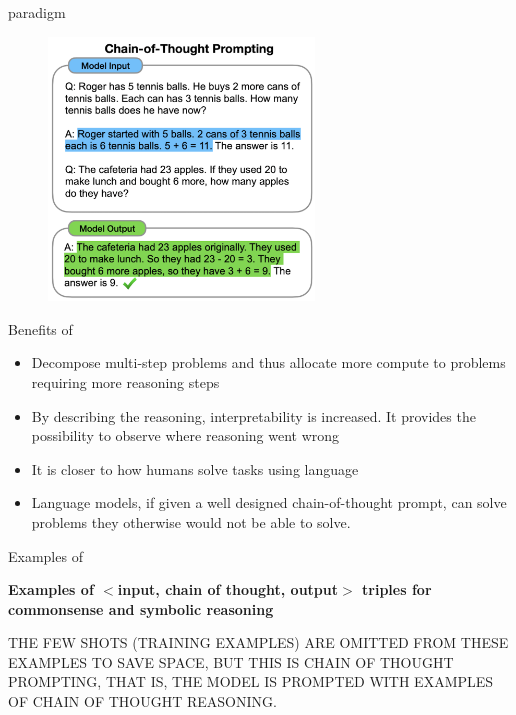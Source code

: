 
\begin{vbframe}{\cotpfull paradigm}

\begin{figure}
    \centering
    \includegraphics[height=7cm]{figure/chain_of_thought2.png}
\end{figure}

\end{vbframe}



\begin{vbframe}{Benefits of \cotpfull}

\vfill

\begin{itemize}
    \item Decompose multi-step problems and thus allocate more compute to problems requiring more reasoning steps
    \item By describing the reasoning, interpretability is increased. It provides the possibility to observe where reasoning went wrong
    \item It is closer to how humans solve tasks using language
    \item Language models, if
given a well designed chain-of-thought prompt, can
    solve problems they otherwise would not be able to solve.
\end{itemize}

\vfill

\end{vbframe}



\begin{vbframe}{Examples of \cotpfull}

\vfill

\textbf{Examples of $<$input, chain of thought, output$>$ triples for  commonsense and symbolic reasoning}


THE FEW SHOTS (TRAINING EXAMPLES) ARE OMITTED FROM THESE
EXAMPLES TO SAVE SPACE, BUT THIS IS CHAIN OF THOUGHT
PROMPTING, THAT IS, THE MODEL IS PROMPTED WITH EXAMPLES OF
CHAIN OF THOUGHT REASONING.


\vfill

\end{vbframe}

